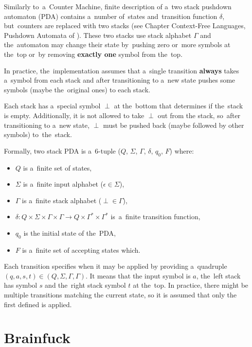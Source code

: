 \documentclass[english,shortabstract,mgr]{iithesis}
\begin{document}
Similarly to~a~Counter Machine, finite description of a~two stack pushdown automaton
(PDA) contains a~number of~states and~transition function $\delta$,
but~counters are replaced with two stacks
(see Chapter Context-Free Languages, Pushdown Automata of \cite{sipser2012ChurchTuring}).
These two stacks use stack alphabet $\Gamma$ and the~automaton may change their state
by~pushing zero or~more symbols at the~top or~by removing \textbf{exactly one} symbol from
the~top.

In practice, the~implementation assumes that a~single transition \textbf{always} takes
a~symbol from each stack and after transitioning to a~new state pushes some symbols
(maybe the~original ones) to each stack.

Each stack has a~special symbol $\perp$ at the~bottom that determines if the~stack is
empty. Additionally, it is not allowed to take $\perp$ out from the stack, so~after transitioning
to a~new state, $\perp$ must be pushed back (maybe followed by other symbols) to~the~stack.

Formally, two stack PDA is a~$6$-tuple ($Q$, $\Sigma$, $\Gamma$, $\delta$, $q_0$, $F$) where:
\begin{itemize}
  \item $Q$ is a~finite set of states,
  \item $\Sigma$ is a~finite input alphabet ($\epsilon \in \Sigma$),
  \item $\Gamma$ is a~finite stack alphabet ($\perp \in \Gamma$),
  \item $\delta: Q \times \Sigma \times \Gamma \times \Gamma \rightarrow
      Q \times \Gamma^* \times \Gamma^*$ is~a~finite transition function,
  \item $q_0$ is the initial state of the~PDA,
  \item $F$ is a~finite set of accepting states which.
\end{itemize}

Each transition specifies when it may be applied by providing a~quadruple
$(q, a, s, t) \in (Q, \Sigma, \Gamma, \Gamma)$. It means that the input symbol is $a$,
the~left stack has symbol $s$ and the~right stack symbol $t$ at the~top. In practice, there
might be multiple transitions matching the current state, so it is assumed that only the first
defined is applied.

\section{Brainfuck}
\end{document}
